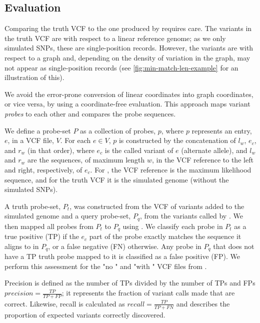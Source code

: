 \subsection{Evaluation}
\label{sec:denovo-sims-eval}

Comparing the truth VCF to the one produced by \pandora{} requires care. The variants in the truth VCF are with respect to a linear reference genome; as we only simulated SNPs, these are single-position records. However, the \pandora{} variants are with respect to a graph and, depending on the density of variation in the graph, may not appear as single-position records (see \autoref{fig:min-match-len-example} for an illustration of this). 

We avoid the error-prone conversion of linear coordinates into graph coordinates, or vice versa, by using a coordinate-free evaluation. This approach maps variant \emph{probes} to each other and compares the probe sequences.  

We define a probe-set $P$ as a collection of probes, $p$, where $p$ represents an entry, $e$, in a VCF file, $V$. For each $e \in V$, $p$ is constructed by the concatenation of $l_w$, $e_c$, and $r_w$ (in that order), where $e_c$ is the called variant of $e$ (alternate allele), and $l_w$ and $r_w$ are the sequences, of maximum length $w$, in the VCF reference to the left and right, respectively, of $e_c$. For \pandora{}, the VCF reference is the maximum likelihood sequence, and for the truth VCF it is the simulated genome (without the simulated SNPs).

A truth probe-set, $P_t$, was constructed from the VCF of variants added to the simulated genome and a query probe-set, $P_q$, from the variants called by \pandora{}. We then mapped all probes from $P_t$ to $P_q$ using  \cite{li2013}. We classify each probe in $P_t$ as a true positive (TP) if the $e_c$ part of the probe exactly matches the sequence it aligns to in $P_q$, or a false negative (FN) otherwise. Any probe in $P_q$ that does not have a TP truth probe mapped to it is classified as a false positive (FP). We perform this assessment for the "no \denovo{}" and "with \denovo{}" VCF files from \pandora{}. 

Precision is defined as the number of TPs divided by the number of TPs and FPs $precision=\frac{TP}{TP+FP}$; it represents the fraction of variant calls made that are correct. Likewise, recall is calculated as $recall=\frac{TP}{TP+FN}$ and describes the proportion of expected variants correctly discovered.

